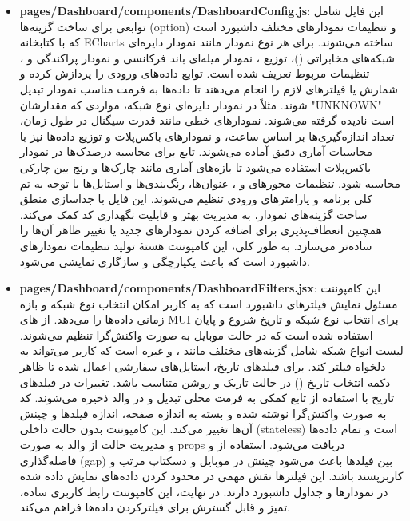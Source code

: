 \begin{itemize}
    	\item \textbf{pages/Dashboard/components/DashboardConfig.js}:  
    	این فایل شامل توابعی برای ساخت گزینه‌ها (option) و تنظیمات نمودارهای مختلف داشبورد است که با کتابخانه ECharts ساخته می‌شوند.  
    	برای هر نوع نمودار مانند نمودار دایره‌ای شبکه‌های مخابراتی ()، توزیع ، نمودار میله‌ای باند فرکانسی و نمودار پراکندگی  و ، تنظیمات مربوط تعریف شده است.  
    	توابع داده‌های ورودی را پردازش کرده و شمارش یا فیلترهای لازم را انجام می‌دهند تا داده‌ها به فرمت مناسب نمودار تبدیل شوند.  
    	مثلاً در نمودار دایره‌ای نوع شبکه، مواردی که مقدارشان "UNKNOWN" است نادیده گرفته می‌شوند.  
    	نمودارهای خطی مانند قدرت سیگنال در طول زمان، تعداد اندازه‌گیری‌ها بر اساس ساعت، و نمودارهای باکس‌پلات و توزیع داده‌ها نیز با محاسبات آماری دقیق آماده می‌شوند.  
    	تابع  برای محاسبه درصدک‌ها در نمودار باکس‌پلات استفاده می‌شود تا بازه‌های آماری مانند چارک‌ها و رنج بین چارکی محاسبه شود.  
    	تنظیمات محورهای  و ، عنوان‌ها، رنگ‌بندی‌ها و استایل‌ها با توجه به تم کلی برنامه و پارامترهای ورودی تنظیم می‌شوند.  
    	این فایل با جداسازی منطق ساخت گزینه‌های نمودار، به مدیریت بهتر و قابلیت نگهداری کد کمک می‌کند.  
    	همچنین انعطاف‌پذیری برای اضافه کردن نمودارهای جدید یا تغییر ظاهر آن‌ها را ساده‌تر می‌سازد.  
    	به طور کلی، این کامپوننت هستهٔ تولید تنظیمات نمودارهای داشبورد است که باعث یکپارچگی و سازگاری نمایشی می‌شود.
    	
    	\item \textbf{pages/Dashboard/components/DashboardFilters.jsx}:  
    	این کامپوننت مسئول نمایش فیلترهای داشبورد است که به کاربر امکان انتخاب نوع شبکه و بازه زمانی داده‌ها را می‌دهد.  
    	از های MUI برای انتخاب نوع شبکه و تاریخ شروع و پایان استفاده شده است که در حالت موبایل به صورت واکنش‌گرا تنظیم می‌شوند.  
    	لیست انواع شبکه شامل گزینه‌های مختلف مانند ،  و غیره است که کاربر می‌تواند به دلخواه فیلتر کند.  
    	برای فیلدهای تاریخ، استایل‌های سفارشی اعمال شده تا ظاهر دکمه انتخاب تاریخ () در حالت تاریک و روشن متناسب باشد.  
    	تغییرات در فیلدهای تاریخ با استفاده از تابع کمکی  به فرمت محلی تبدیل و در  والد ذخیره می‌شوند.  
    	کد به صورت واکنش‌گرا نوشته شده و بسته به اندازه صفحه، اندازه فیلدها و چینش آن‌ها تغییر می‌کند.  
    	این کامپوننت بدون حالت داخلی (stateless) است و تمام داده‌ها و مدیریت حالت از والد به صورت props دریافت می‌شود.  
    	استفاده از  و فاصله‌گذاری (gap) بین فیلدها باعث می‌شود چینش در موبایل و دسکتاپ مرتب و کاربرپسند باشد.  
    	این فیلترها نقش مهمی در محدود کردن داده‌های نمایش داده شده در نمودارها و جداول داشبورد دارند.  
    	در نهایت، این کامپوننت رابط کاربری ساده، تمیز و قابل گسترش برای فیلترکردن داده‌ها فراهم می‌کند.
    	

\end{itemize}
